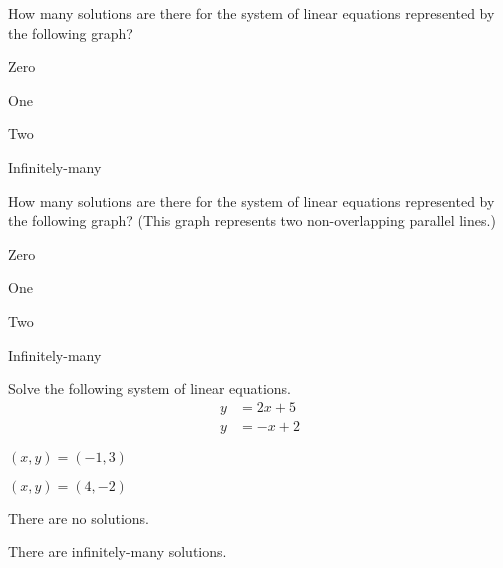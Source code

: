 \begin{readinessAssuranceTest}
\item How many solutions are there for the system of linear equations
      represented by the following graph?
    \begin{center}
      \systemWithOneSolutionA
    \end{center}

\begin{multicols}{4}
\begin{readinessAssuranceTestChoices}
\item Zero
\item One %
\item Two
\item Infinitely-many
\end{readinessAssuranceTestChoices}
\end{multicols}


\item How many solutions are there for the system of linear equations
      represented by the following graph? (This graph represents two
      non-overlapping parallel lines.)
    \begin{center}
      \systemWithNoSolutions
    \end{center}

\begin{multicols}{4}
\begin{readinessAssuranceTestChoices}
\item Zero %
\item One
\item Two
\item Infinitely-many
\end{readinessAssuranceTestChoices}
\end{multicols}


\item Solve the following system of linear equations.
      \begin{align*}
      y   &=   2x+5 \\
      y  &=  -x+2
      \end{align*}

\begin{multicols}{4}
\begin{readinessAssuranceTestChoices}
\item \((x,y)=(-1,3)\) %
\item \((x,y)=(4,-2)\)
\item There are no solutions.
\item There are infinitely-many solutions.
\end{readinessAssuranceTestChoices}
\end{multicols}



\end{readinessAssuranceTest}
